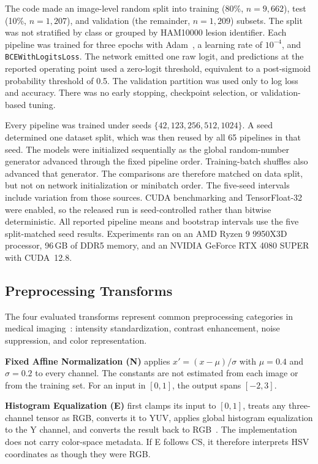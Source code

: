 \documentclass[preprint,review,12pt]{elsarticle}
\begin{document}
The code made an image-level random split into training (80\%, $n=9{,}662$), test (10\%, $n=1{,}207$), and validation (the remainder, $n=1{,}209$) subsets. The split was not stratified by class or grouped by HAM10000 lesion identifier. Each pipeline was trained for three epochs with Adam~\cite{KingmaBa2015}, a learning rate of $10^{-4}$, and \texttt{BCEWithLogitsLoss}. The network emitted one raw logit, and predictions at the reported operating point used a zero-logit threshold, equivalent to a post-sigmoid probability threshold of 0.5. The validation partition was used only to log loss and accuracy. There was no early stopping, checkpoint selection, or validation-based tuning.

Every pipeline was trained under seeds $\{42,123,256,512,1024\}$. A seed determined one dataset split, which was then reused by all 65 pipelines in that seed. The models were initialized sequentially as the global random-number generator advanced through the fixed pipeline order. Training-batch shuffles also advanced that generator. The comparisons are therefore matched on data split, but not on network initialization or minibatch order. The five-seed intervals include variation from those sources. CUDA benchmarking and TensorFloat-32 were enabled, so the released run is seed-controlled rather than bitwise deterministic. All reported pipeline means and bootstrap intervals use the five split-matched seed results. Experiments ran on an AMD Ryzen 9 9950X3D processor, 96\,GB of DDR5 memory, and an NVIDIA GeForce RTX 4080 SUPER with CUDA~12.8.

\subsection{Preprocessing Transforms}

The four evaluated transforms represent common preprocessing categories in medical imaging~\cite{Brinker2019, RODRIGUES2020103542, Tarawneh2024, computers8030062}: intensity standardization, contrast enhancement, noise suppression, and color representation.

\textbf{Fixed Affine Normalization (N)} applies $x'=(x-\mu)/\sigma$ with $\mu=0.4$ and $\sigma=0.2$ to every channel. The constants are not estimated from each image or from the training set. For an input in $[0,1]$, the output spans $[-2,3]$.

\textbf{Histogram Equalization (E)} first clamps its input to $[0,1]$, treats any three-channel tensor as RGB, converts it to YUV, applies global histogram equalization to the Y channel, and converts the result back to RGB~\cite{10.5555/1076432, 9025640, 10810559}. The implementation does not carry color-space metadata. If E follows CS, it therefore interprets HSV coordinates as though they were RGB.
\end{document}
